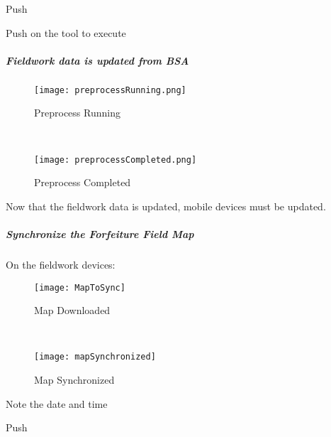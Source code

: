  {\bigbtn Push   \lookArrow} 

 {\bigbtn Push  on the tool to execute  \lookArrow} 

\clearpage


\subparagraph*{Fieldwork data is updated from BSA}




  \begin{figure}[h!]

\centering
     \texttt{[image: preprocessRunning.png]}
\caption{Preprocess Running}
  \vspace{.5in}
 
  \HRule \\[.4cm] %
  \vspace{.5in}
    
     \texttt{[image: preprocessCompleted.png]}
\caption{Preprocess Completed}
 \end{figure}


\noindent Now that the fieldwork data is updated, mobile devices must be updated. 



\clearpage


 \subparagraph{Synchronize the Forfeiture Field Map}
  \vspace{.2in}
  
\noindent On the fieldwork devices:

 \begin{wrapfigure}{r}{0.6\textwidth}
 \centering
     \texttt{[image: MapToSync]}
 \vspace{-.2in}
 
 \caption{Map Downloaded}
 \vspace{-.1in}

 \HRule \\[.4cm] %
 \vspace{-.1in}

     \texttt{[image: mapSynchronized]}
 \vspace{-.2in}

 \caption{Map Synchronized}
 \end{wrapfigure}
 \vspace{.5in}
 
{\smallbtn Note the date and time}
 \vspace{.5in}

{\bigbtn Push   \lookArrow}

